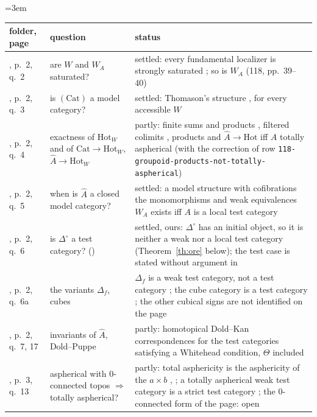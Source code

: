\begin{center}\scriptsize\emergencystretch=3em
\begin{tabularx}{\linewidth}{>{\raggedright\arraybackslash}p{1.25cm}>{\raggedright\arraybackslash}X>{\raggedright\arraybackslash}p{5.2cm}}
\toprule
folder, page & question & status\\
\midrule
108, p.~2, q.~2 & are $W$ and $W_A$ saturated? & settled: every fundamental localizer is strongly saturated \cite[Prop.~4.2.4]{cisinski-308}; so is $W_A$ (118, pp.~39--40)\\
108, p.~2, q.~3 & is $(\mathrm{Cat})$ a model category? & settled: Thomason's structure \cite[Th.~5.2.12, 5.2.15]{cisinski-308}, for every accessible $W$\\
108, p.~2, q.~4 & exactness of $\mathrm{Hot}_W$ and of $\mathrm{Cat}\to\mathrm{Hot}_W$, $\widehat A\to\mathrm{Hot}_W$ & partly: finite sums and products \cite[\S9]{maltsiniotis-2001}, filtered colimits \cite[Cor.~4.2.22]{cisinski-308}, products and $\widehat A\to\mathrm{Hot}$ iff $A$ totally aspherical \cite[Prop.~4.3.2]{cisinski-308} (with the correction of row \nolinkurl{118-groupoid-products-not-totally-aspherical})\\
108, p.~2, q.~5 & when is $\widehat A$ a closed model category? & settled: a model structure with cofibrations the monomorphisms and weak equivalences $W_A$ exists iff $A$ is a local test category \cite[introduction, Th.~1.4.3, Cor.~4.2.18]{cisinski-308}\\
108, p.~2, q.~6 & is $\Delta^{\circ}$ a test category? (\q{no}) & settled, ours: $\Delta^\circ$ has an initial object, so it is neither a weak nor a local test category (Theorem~\ref{th:ore} below); the test case is stated without argument in \cite[\S88]{ps-arxiv}\\
108, p.~2, q.~6a & the variants $\Delta_f$, cubes & $\Delta_f$ is a weak test category, not a test category \cite[\S8]{maltsiniotis-2001}; the cube category is a test category \cite[Cor.~8.4.13]{cisinski-308}; the other cubical signs are not identified on the page\\
108, p.~2, q.~7, 17 & invariants of $\widehat A$, Dold--Puppe & partly: homotopical Dold--Kan correspondences for the test categories satisfying a Whitehead condition, $\Theta$ included \cite{hubert-thesis,hubert-dk}\\
108, p.~3, q.~13 & aspherical with 0-connected topos $\Rightarrow$ totally aspherical? & partly: total asphericity is the asphericity of the $a\times b$ \cite[4.3.1--4.3.2]{cisinski-308}, \cite[Prop.~7.1]{maltsiniotis-2001}; a totally aspherical weak test category is a strict test category \cite[Prop.~1.17]{hubert-dk}; the 0-connected form of the page: open\\

\end{tabularx}
\end{center}
